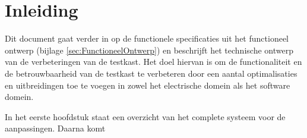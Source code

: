 \section{Inleiding}

Dit document gaat verder in op de functionele specificaties uit het functioneel ontwerp (bijlage \ref{sec:FunctioneelOntwerp}) en beschrijft het technische ontwerp van de verbeteringen van de testkast. Het doel hiervan is om de functionaliteit en de betrouwbaarheid van de testkast te verbeteren door een aantal optimalisaties en uitbreidingen toe te voegen in zowel het electrische domein als het software domein.

\vspace{0.5cm}

In het eerste hoofdstuk staat een overzicht van het complete systeem voor de aanpassingen. Daarna komt 